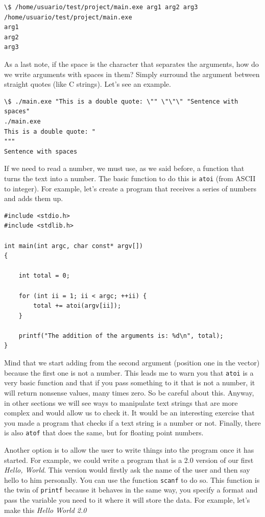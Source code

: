 \documentclass[a4paper]{article}
\begin{document}
\begin{lstlisting}[style=terminalStyle]
\$ /home/usuario/test/project/main.exe arg1 arg2 arg3
/home/usuario/test/project/main.exe
arg1
arg2
arg3
\end{lstlisting}

As a last note, if the space is the character that separates the arguments, how
do we write arguments with spaces in them? Simply surround the argument between
straight quotes (like C strings). Let's see an example.
\begin{lstlisting}[style=terminalStyle]
\$ ./main.exe "This is a double quote: \"" \"\"\" "Sentence with spaces"
./main.exe
This is a double quote: "
"""
Sentence with spaces
\end{lstlisting}

If we need to read a number, we must use, as we said before, a function that
turns the text into a number. The basic function to do this is \verb!atoi!
(from ASCII to integer). For example, let's create a program that receives a
series of numbers and adds them up.

\noindent
\begin{minipage}[H]{\linewidth}
\mbox{}
\begin{lstlisting}[style=C,
caption={Program that adds its arguments},
label={lst:sumArgs}]
#include <stdio.h>
#include <stdlib.h>

int main(int argc, char const* argv[])
{

    int total = 0;

    for (int ii = 1; ii < argc; ++ii) {
        total += atoi(argv[ii]);
    }

    printf("The addition of the arguments is: %d\n", total);
}
\end{lstlisting}
\end{minipage}

Mind that we start adding from the second argument (position one in the vector)
because the first one is not a number. This leads me to warn you that
\verb!atoi! is a very basic function and that if you pass something to it that
is not a number, it will return nonsense values, many times zero. So be careful
about this. Anyway, in other sections we will see ways to manipulate text
strings that are more complex and would allow us to check it. It would be an
interesting exercise that you made a program that checks if a text string is a
number or not. Finally, there is also \verb!atof! that does the same, but for
floating point numbers.

Another option is to allow the user to write things into the program once
it has started. For example, we could write a program that is a 2.0 version of
our first \textit{Hello, World}. This version would firstly ask the name of the
user and then say hello to him personally. You can use the function \verb!scanf!
to do so. This function is the twin of \verb!printf! because it behaves in the
same way, you specify a format and pass the variable you need to it where it
will store the data. For example, let's make this \textit{Hello World 2.0}
\end{document}
